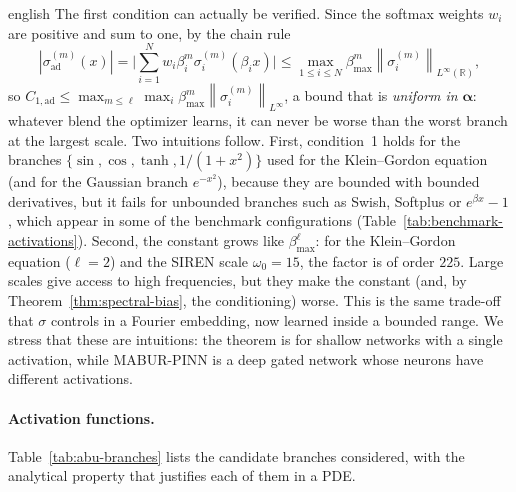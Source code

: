 \documentclass[12pt,letterpaper,twoside]{book}
\newcommand{\norm}[1]{\left\lVert #1 \right\rVert}
\newcommand{\abs}[1]{\left\lvert #1 \right\rvert}
\begin{document}
\begin{hyphenrules}{english}
The first condition can actually be verified. Since the softmax weights $w_i$ are positive and sum to one,
by the chain rule
\begin{equation}
  \abs{\sigma^{(m)}_{\mathrm{ad}}(x)}=\Big|\sum_{i=1}^{N}w_i\beta_i^{m}\sigma_i^{(m)}(\beta_ix)\Big|
  \le\max_{1\le i\le N}\beta_{\max}^{m}\norm{\sigma_i^{(m)}}_{L^\infty(\mathbb{R})},
  \label{eq:abu-bound}
\end{equation}
so $C_{1,\mathrm{ad}}\le\max_{m\le\ell}\max_i\beta_{\max}^{m}\norm{\sigma_i^{(m)}}_{L^\infty}$, a bound that is
\emph{uniform in} $\bm\alpha$: whatever blend the optimizer learns, it can never be worse than the worst
branch at the largest scale. Two intuitions follow. First, condition~1 holds for the branches
$\{\sin,\cos,\tanh,1/(1+x^2)\}$ used for the Klein--Gordon equation (and for the Gaussian branch
$e^{-x^2}$), because they are bounded with bounded derivatives, but it fails for unbounded branches such as
Swish, Softplus or $e^{\beta x}-1$, which appear in some of the benchmark configurations
(Table~\ref{tab:benchmark-activations}). Second, the constant grows like $\beta_{\max}^{\ell}$: for the
Klein--Gordon equation ($\ell=2$) and the SIREN scale $\omega_0=15$, the factor is of order $225$. Large
scales give access to high frequencies, but they make the constant (and, by Theorem~\ref{thm:spectral-bias}, the
conditioning) worse. This is the same trade-off that $\sigma$ controls in a Fourier embedding, now learned
inside a bounded range. We stress that these are intuitions: the theorem is for shallow networks with a
single activation, while MABUR-PINN is a deep gated network whose neurons have different activations.

\paragraph{Activation functions.}
Table~\ref{tab:abu-branches} lists the candidate branches considered, with the analytical property that
justifies each of them in a PDE.


\end{hyphenrules}
\end{document}
